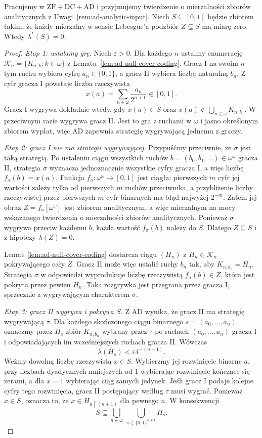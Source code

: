 \begin{lemat}
\label{lem:ad-covering-game}
Pracujemy w $\mathrm{ZF}+\mathrm{DC}+\mathrm{AD}$
i przyjmujemy twierdzenie o mierzalności zbiorów
analitycznych z Uwagi~\ref{rem:ad-analytic-input}.
Niech $S\subseteq[0,1]$ będzie zbiorem takim, że
każdy mierzalny w sensie Lebesgue'a podzbiór
$Z\subseteq S$ ma miarę zero. Wtedy
$\lambda^*(S)=0$.
\end{lemat}
\begin{proof}
\emph{Etap 1: ustalamy grę.}
Niech $\varepsilon>0$. Dla każdego $n$ ustalmy
enumerację $\mathcal K_n=\{K_{n,k}:k\in\omega\}$
z Lematu~\ref{lem:ad-null-cover-coding}.
Gracz I na swoim $n$-tym ruchu wybiera cyfrę
$a_n\in\{0,1\}$, a gracz II wybiera
liczbę naturalną $b_n$. Z cyfr gracza I
powstaje liczba rzeczywista
\[
 x(a)=\sum_{n\in\omega}\frac{a_n}{2^{n+1}}
 \in[0,1].
\]
Gracz I wygrywa dokładnie wtedy, gdy
$x(a)\in S$ oraz
$x(a)\notin\bigcup_{n\in\omega}K_{n,b_n}$.
W przeciwnym razie wygrywa gracz II.
Jest to gra z ruchami w $\omega$ i jasno
określonym zbiorem wypłat, więc AD zapewnia
strategię wygrywającą jednemu z graczy.

\emph{Etap 2: gracz I nie ma strategii wygrywającej.}
Przypuśćmy przeciwnie, że $\sigma$ jest taką
strategią. Po ustaleniu ciągu wszystkich ruchów
$b=(b_0,b_1,\ldots)\in\omega^\omega$ gracza II,
strategia $\sigma$ wyznacza jednoznacznie
wszystkie cyfry gracza I, a więc liczbę
$f_\sigma(b)=x(a)$.
Funkcja $f_\sigma:\omega^\omega\to[0,1]$
jest ciągła: pierwszych $m$ cyfr jej wartości
zależy tylko od pierwszych $m$ ruchów przeciwnika,
a przybliżenie liczby rzeczywistej przez pierwszych
$m$ cyfr binarnych ma błąd najwyżej $2^{-m}$.
Zatem jej obraz $Z=f_\sigma[\omega^\omega]$
jest zbiorem analitycznym, a więc mierzalnym
na mocy wskazanego twierdzenia o mierzalności zbiorów analitycznych.
Ponieważ $\sigma$ wygrywa przeciw każdemu $b$,
każda wartość $f_\sigma(b)$ należy do $S$.
Dlatego $Z\subseteq S$ i z hipotezy
$\lambda(Z)=0$.

Lemat~\ref{lem:ad-null-cover-coding} dostarcza
ciągu $(H_n)$ z $H_n\in\mathcal K_n$
pokrywającego cały $Z$. Gracz II może więc
ustalić ruchy $b_n$ tak, aby $K_{n,b_n}=H_n$.
Strategia $\sigma$ w odpowiedzi wyprodukuje
liczbę rzeczywistą $f_\sigma(b)\in Z$, która
jest pokryta przez pewien $H_n$. Taka rozgrywka
jest przegrana przez gracza I, sprzecznie z
wygrywającym charakterem $\sigma$.

\emph{Etap 3: gracz II wygrywa i pokrywa $S$.}
Z AD wynika, że gracz II ma strategię wygrywającą
$\tau$. Dla każdego skończonego ciągu binarnego
$s=(a_0,\ldots,a_n)$ oznaczmy przez $H_s$
zbiór $K_{n,b_n}$ wybrany przez $\tau$ po ruchach
$(a_0,\ldots,a_n)$ gracza I i odpowiadających
im wcześniejszych ruchach gracza II.
Wówczas
\[
 \lambda(H_s)<\varepsilon 4^{-(n+1)}.
\]
Weźmy dowolną liczbę rzeczywistą $x\in S$.
Wybierzmy jej rozwinięcie binarne $a$,
przy liczbach dyadycznych mniejszych od $1$ wybierając
rozwinięcie kończące się zerami, a dla $x=1$ wybierając
ciąg samych jedynek. Jeśli gracz I podaje
kolejne cyfry tego rozwinięcia, gracz II
postępujący według $\tau$ musi wygrać.
Ponieważ $x\in S$, oznacza to, że
$x\in H_{a\upharpoonright(n+1)}$ dla pewnego $n$.
W konsekwencji
\[
 S\subseteq\bigcup_{n\in\omega}\ \bigcup_{s\in\{0,1\}^{n+1}}H_s.
\]


\end{proof}
